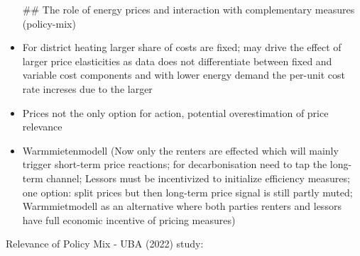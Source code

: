 \documentclass[12pt,twoside]{reedthesis}
\begin{document}
\begin{itemize}
  \#\# The role of energy prices and interaction with complementary measures (policy-mix)
\item
  For district heating larger share of costs are fixed; may drive the effect of larger price elasticities as data does not differentiate between fixed and variable cost components and with lower energy demand the per-unit cost rate increses due to the larger
\item
  Prices not the only option for action, potential overestimation of price relevance
\item
  Warmmietenmodell (Now only the renters are effected which will mainly trigger short-term price reactions; for decarbonisation need to tap the long-term channel; Lessors must be incentivized to initialize efficiency measures; one option: split prices but then long-term price signal is still partly muted; Warmmietmodell as an alternative where both parties renters and lessors have full economic incentive of pricing measures)
\end{itemize}
Relevance of Policy Mix - UBA (2022) study:
\end{document}
